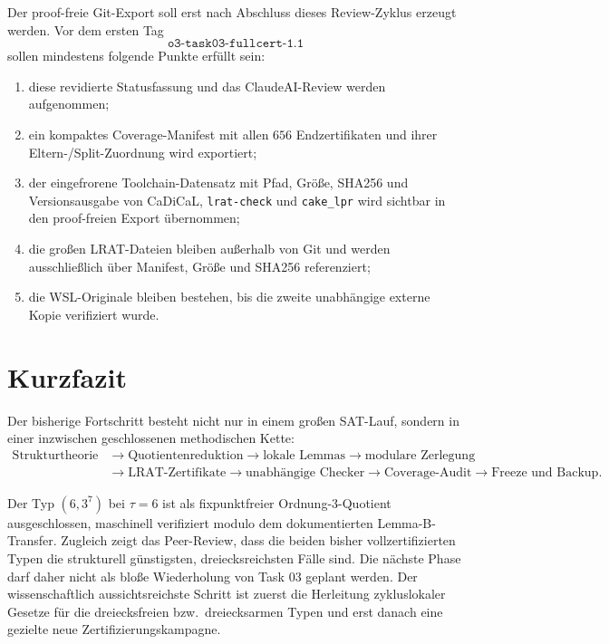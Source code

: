 \documentclass[11pt,a4paper]{article}
\newcommand{\code}[1]{\texttt{#1}}
\begin{document}
Der proof-freie Git-Export soll erst nach Abschluss dieses Review-Zyklus erzeugt werden. Vor dem ersten Tag
\[
\code{o3-task03-fullcert-1.1}
\]
sollen mindestens folgende Punkte erfüllt sein:
\begin{enumerate}[nosep]
\item diese revidierte Statusfassung und das ClaudeAI-Review werden aufgenommen;
\item ein kompaktes Coverage-Manifest mit allen $656$ Endzertifikaten und ihrer Eltern-/Split-Zuordnung wird exportiert;
\item der eingefrorene Toolchain-Datensatz mit Pfad, Größe, SHA256 und Versionsausgabe von CaDiCaL, \code{lrat-check} und \code{cake\_lpr} wird sichtbar in den proof-freien Export übernommen;
\item die großen LRAT-Dateien bleiben außerhalb von Git und werden ausschließlich über Manifest, Größe und SHA256 referenziert;
\item die WSL-Originale bleiben bestehen, bis die zweite unabhängige externe Kopie verifiziert wurde.
\end{enumerate}

\section*{Kurzfazit}

Der bisherige Fortschritt besteht nicht nur in einem großen SAT-Lauf, sondern in einer inzwischen geschlossenen methodischen Kette:
\[
\begin{aligned}
\text{Strukturtheorie}
&\rightarrow \text{Quotientenreduktion}
\rightarrow \text{lokale Lemmas}
\rightarrow \text{modulare Zerlegung}\\
&\rightarrow \text{LRAT-Zertifikate}
\rightarrow \text{unabhängige Checker}
\rightarrow \text{Coverage-Audit}
\rightarrow \text{Freeze und Backup}.
\end{aligned}
\]

Der Typ $(6,3^7)$ bei $\tau=6$ ist als fixpunktfreier Ordnung-$3$-Quotient ausgeschlossen, maschinell verifiziert modulo dem dokumentierten Lemma-B-Transfer. Zugleich zeigt das Peer-Review, dass die beiden bisher vollzertifizierten Typen die strukturell günstigsten, dreiecksreichsten Fälle sind. Die nächste Phase darf daher nicht als bloße Wiederholung von Task 03 geplant werden. Der wissenschaftlich aussichtsreichste Schritt ist zuerst die Herleitung zykluslokaler Gesetze für die dreiecksfreien bzw.\ dreiecksarmen Typen und erst danach eine gezielte neue Zertifizierungskampagne.
\end{document}
